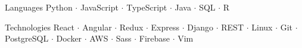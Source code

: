 


\begin{cvskills}

\cvskill
  {Languages} %
  {Python $\cdot$ JavaScript $\cdot$ TypeScript $\cdot$ Java $\cdot$ SQL $\cdot$ R } %




\cvskill
  {Technologies} %
  {React $\cdot$ Angular $\cdot$ Redux $\cdot$ Express $\cdot$ Django $\cdot$ REST $\cdot$ Linux $\cdot$ Git $\cdot$ PostgreSQL $\cdot$ Docker $\cdot$ AWS $\cdot$ Sass $\cdot$ Firebase $\cdot$ Vim } %





\end{cvskills}
